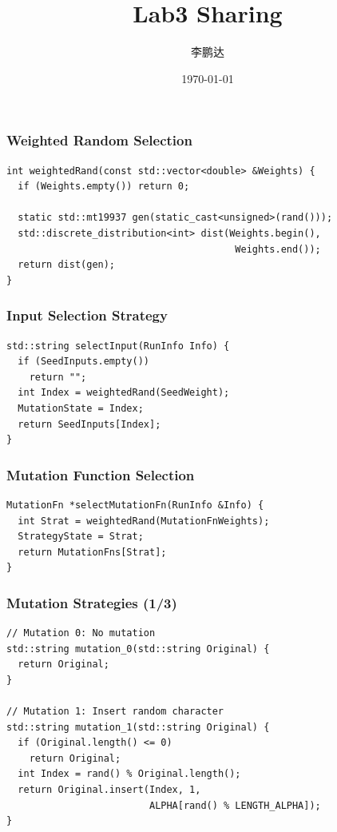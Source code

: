 \documentclass{beamer}
\title{Lab3 Sharing}
\author{李鹏达}
\date{\today}
\begin{document}
\frame{\titlepage}

\begin{frame}[fragile]
\frametitle{Weighted Random Selection}
\begin{lstlisting}
int weightedRand(const std::vector<double> &Weights) {
  if (Weights.empty()) return 0;
  
  static std::mt19937 gen(static_cast<unsigned>(rand()));
  std::discrete_distribution<int> dist(Weights.begin(), 
                                        Weights.end());
  return dist(gen);
}
\end{lstlisting}
\end{frame}

\begin{frame}[fragile]
\frametitle{Input Selection Strategy}
\begin{lstlisting}
std::string selectInput(RunInfo Info) {
  if (SeedInputs.empty()) 
    return "";
  int Index = weightedRand(SeedWeight);
  MutationState = Index;
  return SeedInputs[Index];
}
\end{lstlisting}
\end{frame}

\begin{frame}[fragile]
\frametitle{Mutation Function Selection}
\begin{lstlisting}
MutationFn *selectMutationFn(RunInfo &Info) {
  int Strat = weightedRand(MutationFnWeights);
  StrategyState = Strat;
  return MutationFns[Strat];
}
\end{lstlisting}
\end{frame}

\begin{frame}[fragile]
\frametitle{Mutation Strategies (1/3)}
\begin{lstlisting}
// Mutation 0: No mutation
std::string mutation_0(std::string Original) { 
  return Original; 
}

// Mutation 1: Insert random character
std::string mutation_1(std::string Original) {
  if (Original.length() <= 0)
    return Original;
  int Index = rand() % Original.length();
  return Original.insert(Index, 1, 
                         ALPHA[rand() % LENGTH_ALPHA]);
}
\end{lstlisting}
\end{frame}
\end{document}

